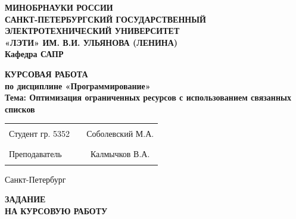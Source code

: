 \documentclass[12pt]{extarticle}
\begin{document}
\renewcommand\contentsname{\normalsize СОДЕРЖАНИЕ}

\begin{center}
  \textbf{МИНОБРНАУКИ РОССИИ} \\
  \textbf{САНКТ-ПЕТЕРБУРГСКИЙ ГОСУДАРСТВЕННЫЙ} \\
  \textbf{ЭЛЕКТРОТЕХНИЧЕСКИЙ УНИВЕРСИТЕТ} \\
  \textbf{«ЛЭТИ» ИМ. В.И. УЛЬЯНОВА (ЛЕНИНА)} \\
  \textbf{Кафедра САПР} \\
\end{center}

\vspace{0.25\textheight}

\begin{center}
\textbf{КУРСОВАЯ РАБОТА} \\
\textbf{по дисциплине «Программирование»} \\
\textbf{Тема: Оптимизация ограниченных ресурсов с использованием связанных списков} \\
\end{center}

\vspace*{\fill}

\begin{center}
\begin{tabularx}{\textwidth}{ l X c }
 Студент гр. 5352 & \rule{8cm}{0.2mm} & Соболевский М.А. \\
 Преподаватель & \rule{8cm}{0.2mm} & Калмычков В.А. \\
\end{tabularx}
\end{center}

\vspace{3em}

\begin{center}
Санкт-Петербург\\
\the\year
\end{center}

\thispagestyle{empty}

\pagebreak

\centering \textbf{ЗАДАНИЕ} \\ \textbf{НА КУРСОВУЮ РАБОТУ}
\end{document}
